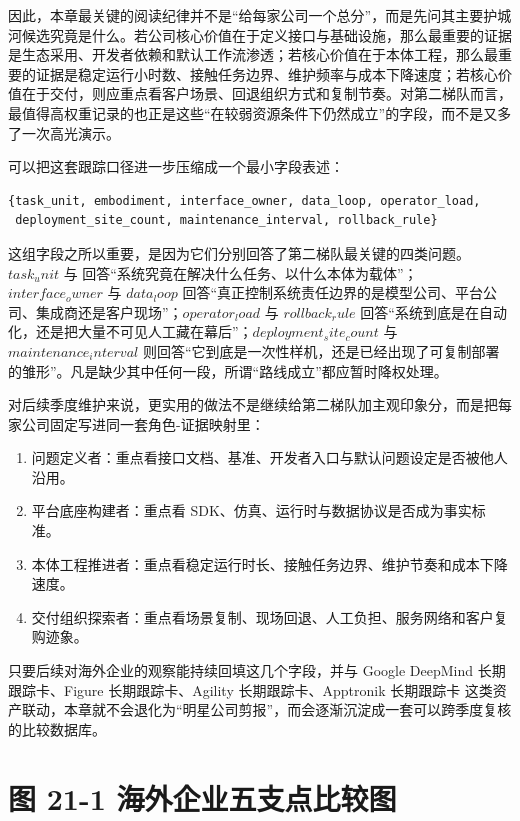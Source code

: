 因此，本章最关键的阅读纪律并不是“给每家公司一个总分”，而是先问其主要护城河候选究竟是什么。若公司核心价值在于定义接口与基础设施，那么最重要的证据是生态采用、开发者依赖和默认工作流渗透；若核心价值在于本体工程，那么最重要的证据是稳定运行小时数、接触任务边界、维护频率与成本下降速度；若核心价值在于交付，则应重点看客户场景、回退组织方式和复制节奏。对第二梯队而言，最值得高权重记录的也正是这些“在较弱资源条件下仍然成立”的字段，而不是又多了一次高光演示。

可以把这套跟踪口径进一步压缩成一个最小字段表述：

\begin{lstlisting}
{task_unit, embodiment, interface_owner, data_loop, operator_load,
 deployment_site_count, maintenance_interval, rollback_rule}
\end{lstlisting}

这组字段之所以重要，是因为它们分别回答了第二梯队最关键的四类问题。\(task_unit\) 与 \texttt{} 回答“系统究竟在解决什么任务、以什么本体为载体”；\(interface_owner\) 与 \(data_loop\) 回答“真正控制系统责任边界的是模型公司、平台公司、集成商还是客户现场”；\(operator_load\) 与 \(rollback_rule\) 回答“系统到底是在自动化，还是把大量不可见人工藏在幕后”；\(deployment_site_count\) 与 \(maintenance_interval\) 则回答“它到底是一次性样机，还是已经出现了可复制部署的雏形”。凡是缺少其中任何一段，所谓“路线成立”都应暂时降权处理。

对后续季度维护来说，更实用的做法不是继续给第二梯队加主观印象分，而是把每家公司固定写进同一套角色-证据映射里：

\begin{enumerate}
\item 问题定义者：重点看接口文档、基准、开发者入口与默认问题设定是否被他人沿用。
\item 平台底座构建者：重点看 SDK、仿真、运行时与数据协议是否成为事实标准。
\item 本体工程推进者：重点看稳定运行时长、接触任务边界、维护节奏和成本下降速度。
\item 交付组织探索者：重点看场景复制、现场回退、人工负担、服务网络和客户复购迹象。
\end{enumerate}

只要后续对海外企业的观察能持续回填这几个字段，并与 Google DeepMind 长期跟踪卡、Figure 长期跟踪卡、Agility 长期跟踪卡、Apptronik 长期跟踪卡 这类资产联动，本章就不会退化为“明星公司剪报”，而会逐渐沉淀成一套可以跨季度复核的比较数据库。

\section*{图 21-1 海外企业五支点比较图}

